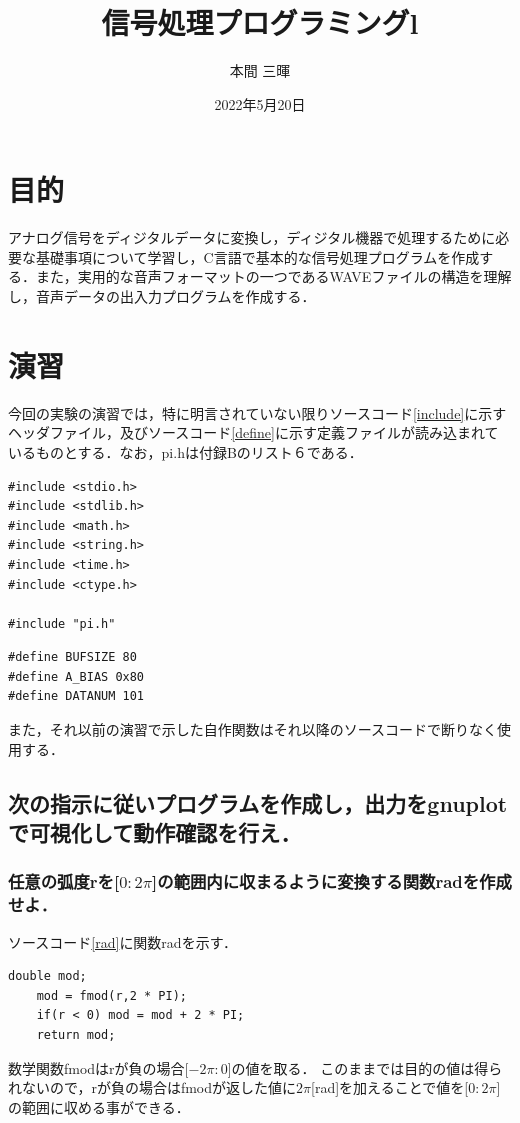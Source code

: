 \documentclass[titlepage]{jarticle}
\title{信号処理プログラミングl}
\author{本間 三暉}
\date{2022年5月20日}
\begin{document}
\maketitle

\section{目的}
アナログ信号をディジタルデータに変換し，ディジタル機器で処理するために必要な基礎事項について学習し，C言語で基本的な信号処理プログラムを作成する．また，実用的な音声フォーマットの一つであるWAVEファイルの構造を理解し，音声データの出入力プログラムを作成する．
\section{演習}
今回の実験の演習では，特に明言されていない限りソースコード\ref{include}に示すヘッダファイル，及びソースコード\ref{define}に示す定義ファイルが読み込まれているものとする．なお，pi.hは付録Bのリスト６である．
\begin{lstlisting}[caption=ヘッダファイル,label=include]
#include <stdio.h>
#include <stdlib.h>
#include <math.h>
#include <string.h>
#include <time.h>
#include <ctype.h>

#include "pi.h"
  \end{lstlisting}
\begin{lstlisting}[caption=定義ファイル,label=define]
#define BUFSIZE 80
#define A_BIAS 0x80
#define DATANUM 101 
  \end{lstlisting}

また，それ以前の演習で示した自作関数はそれ以降のソースコードで断りなく使用する．
\subsection{次の指示に従いプログラムを作成し，出力をgnuplotで可視化して動作確認を行え．}
\subsubsection{任意の弧度rを[$0:2\pi$]の範囲内に収まるように変換する関数radを作成せよ．}
ソースコード\ref{rad}に関数radを示す．
\begin{lstlisting}[caption=double rad(double r),label=rad]
    double mod;
    mod = fmod(r,2 * PI);
    if(r < 0) mod = mod + 2 * PI;
    return mod;
   \end{lstlisting}

数学関数fmodはrが負の場合[$-2\pi:0$]の値を取る．
このままでは目的の値は得られないので，rが負の場合はfmodが返した値に$2\pi$[rad]を加えることで値を[$0:2\pi$]の範囲に収める事ができる．
\end{document}
